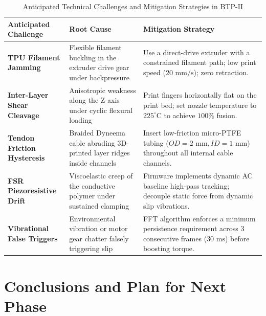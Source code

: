 \documentclass[12pt,a4paper]{report}
\begin{document}
\begin{table}[htbp]
\centering
\small
\caption{Anticipated Technical Challenges and Mitigation Strategies in BTP-II}
\label{tab:challenges}
\begin{tabularx}{\textwidth}{p{32mm}p{48mm}X}
\toprule
\textbf{Anticipated Challenge} & \textbf{Root Cause} & \textbf{Mitigation Strategy} \\
\midrule
\textbf{TPU Filament Jamming} & Flexible filament buckling in the extruder drive gear under backpressure & Use a direct-drive extruder with a constrained filament path; low print speed ($20\text{ mm/s}$); zero retraction. \\
\textbf{Inter-Layer Shear Cleavage} & Anisotropic weakness along the Z-axis under cyclic flexural loading & Print fingers horizontally flat on the print bed; set nozzle temperature to $225^\circ\text{C}$ to achieve $100\%$ fusion. \\
\textbf{Tendon Friction Hysteresis} & Braided Dyneema cable abrading 3D-printed layer ridges inside channels & Insert low-friction micro-PTFE tubing ($OD = 2\text{ mm}, ID = 1\text{ mm}$) throughout all internal cable channels. \\
\textbf{FSR Piezoresistive Drift} & Viscoelastic creep of the conductive polymer under sustained clamping & Firmware implements dynamic AC baseline high-pass tracking; decouple static force from dynamic slip vibrations. \\
\textbf{Vibrational False Triggers} & Environmental vibration or motor gear chatter falsely triggering slip & FFT algorithm enforces a minimum persistence requirement across 3 consecutive frames ($30\text{ ms}$) before boosting torque. \\
\bottomrule
\end{tabularx}
\end{table}

\chapter{Conclusions and Plan for Next Phase}
\end{document}
